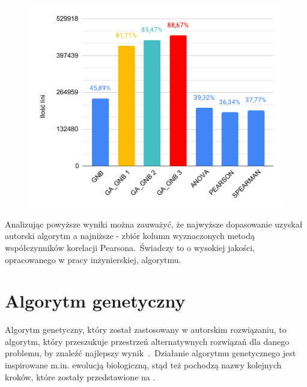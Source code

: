 \begin{figure}[H]
    \centering
    \includegraphics[width=\textwidth]{images/Monday-WorkingHours_cmp}
    \label{fig:mond}
\end{figure}

Analizując powyższe wyniki można zauważyć, że najwyższe dopasowanie uzyskał autorski algorytm a najniższe - zbiór kolumn wyznaczonych metodą współczynników korelacji Pearsona.\ Świadczy to o wysokiej jakości, opracowanego w pracy inżynierskiej, algorytmu.


\section{Algorytm genetyczny}
Algorytm genetyczny, który został zastosowany w autorskim rozwiązaniu, to algorytm, który przeszukuje przestrzeń alternatywnych rozwiązań dla danego problemu, by znaleźć najlepszy
wynik~\cite{Kusiak2021}.\ Działanie algorytmu genetycznego jest inspirowane m.in. ewolucją biologiczną, stąd też pochodzą nazwy kolejnych kroków, które zostały przedstawione na .



